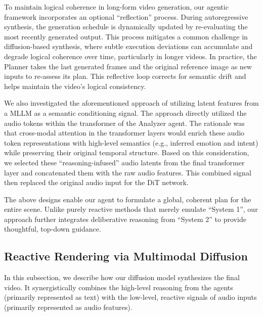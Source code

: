 To maintain logical coherence in long-form video generation, our agentic framework incorporates an optional ``reflection'' process. During autoregressive synthesis, the generation schedule is dynamically updated by re-evaluating the most recently generated output. This process mitigates a common challenge in diffusion-based synthesis, where subtle execution deviations can accumulate and degrade logical coherence over time, particularly in longer videos.
In practice, the Planner takes the last generated frames and the original reference image as new inputs to re-assess its plan. This reflective loop corrects for semantic drift and helps maintain the video's logical consistency.


 
  We also investigated the aforementioned approach of utilizing latent features from a MLLM as a semantic conditioning signal. The approach directly utilized the audio tokens within the transformer of the Analyzer agent. The rationale was that cross-modal attention in the transformer layers would enrich these audio token representations with high-level semantics (e.g., inferred emotion and intent) while preserving their original temporal structure. Based on this consideration, we selected these ``reasoning-infused'' audio latents from the final transformer layer and concatenated them with the raw audio features. This combined signal then replaced the original audio input for the DiT network.
\par

The above designs enable our agent to formulate a global, coherent plan for the entire scene. Unlike purely reactive methods that merely emulate ``System 1'', our approach further integrates deliberative reasoning from ``System 2'' to provide thoughtful, top-down guidance.

\subsection{Reactive Rendering via Multimodal Diffusion}


In this subsection, we describe how our diffusion model synthesizes the final video. It synergistically combines the high-level reasoning from the agents (primarily represented as text) with the low-level, reactive signals of audio inputs (primarily represented as audio features).


